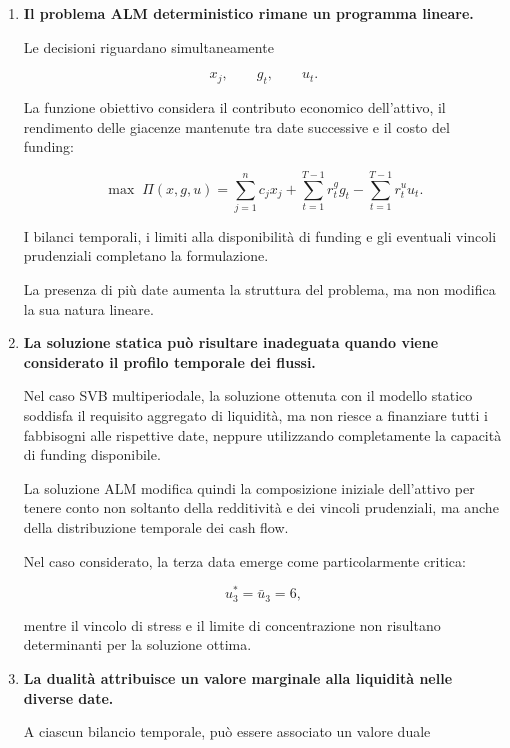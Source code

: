 \begin{enumerate}
\[
u_t
\]

produce invece liquidit\`a alla data corrente ma genera alla data successiva
un obbligo pari a

\[
(1+r^u_t)u_t.
\]

I due strumenti realizzano quindi collegamenti intertemporali di segno
economico opposto.

\item \textbf{Il problema ALM deterministico rimane un programma lineare.}

Le decisioni riguardano simultaneamente

\[
x_j,
\qquad
g_t,
\qquad
u_t.
\]

La funzione obiettivo considera il contributo economico dell'attivo, il
rendimento delle giacenze mantenute tra date successive e il costo del
funding:

\[
\max\;
\Pi(x,g,u)
=
\sum_{j=1}^{n}c_jx_j
+
\sum_{t=1}^{T-1}r^g_tg_t
-
\sum_{t=1}^{T-1}r^u_tu_t.
\]

I bilanci temporali, i limiti alla disponibilit\`a di funding e gli eventuali
vincoli prudenziali completano la formulazione.

La presenza di pi\`u date aumenta la struttura del problema, ma non modifica
la sua natura lineare.

\item \textbf{La soluzione statica pu\`o risultare inadeguata quando viene
considerato il profilo temporale dei flussi.}

Nel caso SVB multiperiodale, la soluzione ottenuta con il modello statico
soddisfa il requisito aggregato di liquidit\`a, ma non riesce a finanziare
tutti i fabbisogni alle rispettive date, neppure utilizzando completamente
la capacit\`a di funding disponibile.

La soluzione ALM modifica quindi la composizione iniziale dell'attivo per
tenere conto non soltanto della redditivit\`a e dei vincoli prudenziali, ma
anche della distribuzione temporale dei cash flow.

Nel caso considerato, la terza data emerge come particolarmente critica:

\[
u_3^*=\bar u_3=6,
\]

mentre il vincolo di stress e il limite di concentrazione non risultano
determinanti per la soluzione ottima.

\item \textbf{La dualit\`a attribuisce un valore marginale alla liquidit\`a
nelle diverse date.}

A ciascun bilancio temporale, pu\`o essere associato un valore duale


\end{enumerate}
